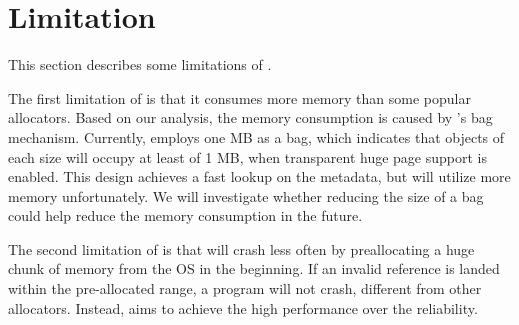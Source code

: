 \section{Limitation}
\label{sec:limit}

This section describes some limitations of \NM{}. 

The first limitation of \NM{} is that it consumes more memory than some popular allocators. Based on our analysis, the memory consumption is caused by \NM{}'s bag mechanism. Currently, \NM{} employs one MB as a bag, which indicates that objects of each size will occupy at least of 1 MB, when transparent huge page support is enabled. This design achieves a fast lookup on the metadata, but will utilize more memory unfortunately. We will investigate whether reducing the size of a bag could help reduce the memory consumption in the future.

The second limitation of \NM{} is that \NM{} will crash less often by preallocating a huge chunk of memory from the OS in the beginning. If an invalid reference is landed within the pre-allocated range, a program will not crash, different from other allocators. Instead, \NM{} aims to achieve the high performance over the reliability. 